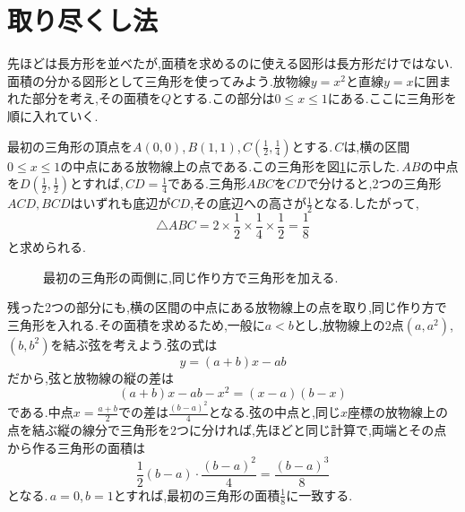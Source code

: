 \section{取り尽くし法}\label{節:取り尽くし法}
先ほどは長方形を並べたが,面積を求めるのに使える図形は長方形だけではない.面積の分かる図形として三角形を使ってみよう.放物線$y=x^2$と直線$y=x$に囲まれた部分を考え,その面積を$Q$とする.この部分は$0\le x\le1$にある.ここに三角形を順に入れていく.

最初の三角形の頂点を$A(0,0)$,\,$B(1,1)$,\,$C\left(\frac12,\frac14\right)$とする.\,$C$は,横の区間$0\le x\le1$の中点にある放物線上の点である.この三角形を図\ref{図:取り尽くし}に示した.\,$AB$の中点を$D\left(\frac12,\frac12\right)$とすれば,\,$CD=\frac14$である.三角形$ABC$を$CD$で分けると,2つの三角形$ACD,BCD$はいずれも底辺が$CD$,その底辺への高さが$\frac12$となる.したがって,
\[
 \triangle ABC=2\times\frac12\times\frac14\times\frac12=\frac18
\]
と求められる.

\begin{figure}[htbp]
\centering
{}
\caption{最初の三角形の両側に,同じ作り方で三角形を加える.}\label{図:取り尽くし}
\end{figure}

残った2つの部分にも,横の区間の中点にある放物線上の点を取り,同じ作り方で三角形を入れる.その面積を求めるため,一般に$a<b$とし,放物線上の2点$(a,a^2)$,\,$(b,b^2)$を結ぶ弦を考えよう.弦の式は
\[
 y=(a+b)x-ab
\]
だから,弦と放物線の縦の差は
\[
 (a+b)x-ab-x^2=(x-a)(b-x)
\]
である.中点$x=\frac{a+b}{2}$での差は$\frac{(b-a)^2}{4}$となる.弦の中点と,同じ$x$座標の放物線上の点を結ぶ縦の線分で三角形を2つに分ければ,先ほどと同じ計算で,両端とその点から作る三角形の面積は
\[
 \frac12(b-a)\cdot\frac{(b-a)^2}{4}=\frac{(b-a)^3}{8}
\]
となる.\,$a=0$,\,$b=1$とすれば,最初の三角形の面積$\frac18$に一致する.

